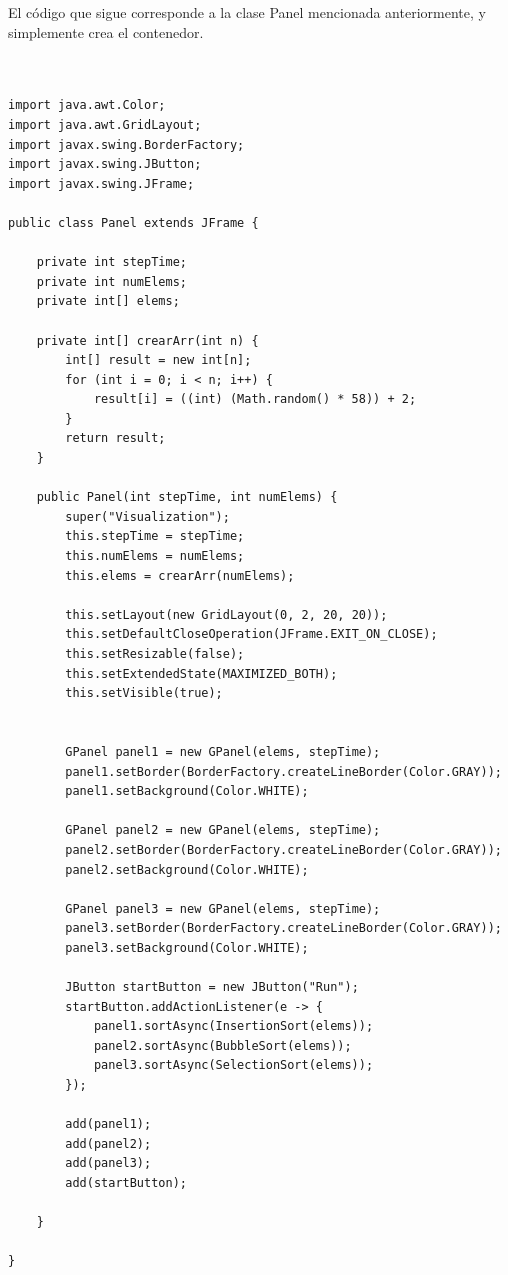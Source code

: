 \documentclass[paper=a4, fontsize=11pt]{scrartcl} %
\numberwithin{equation}{section} %
\numberwithin{figure}{section} %
\numberwithin{table}{section} %
\begin{document}
El código que sigue corresponde a la clase Panel mencionada anteriormente, y simplemente crea el contenedor.

\begin{lstlisting}


import java.awt.Color;
import java.awt.GridLayout;
import javax.swing.BorderFactory;
import javax.swing.JButton;
import javax.swing.JFrame;

public class Panel extends JFrame {

    private int stepTime;
    private int numElems;
    private int[] elems;

    private int[] crearArr(int n) {
        int[] result = new int[n];
        for (int i = 0; i < n; i++) {
            result[i] = ((int) (Math.random() * 58)) + 2;
        }
        return result;
    }

    public Panel(int stepTime, int numElems) {
        super("Visualization");
        this.stepTime = stepTime;
        this.numElems = numElems;
        this.elems = crearArr(numElems);

        this.setLayout(new GridLayout(0, 2, 20, 20));
        this.setDefaultCloseOperation(JFrame.EXIT_ON_CLOSE);
        this.setResizable(false);
        this.setExtendedState(MAXIMIZED_BOTH);
        this.setVisible(true);


        GPanel panel1 = new GPanel(elems, stepTime);
        panel1.setBorder(BorderFactory.createLineBorder(Color.GRAY));
        panel1.setBackground(Color.WHITE);

        GPanel panel2 = new GPanel(elems, stepTime);
        panel2.setBorder(BorderFactory.createLineBorder(Color.GRAY));
        panel2.setBackground(Color.WHITE);

        GPanel panel3 = new GPanel(elems, stepTime);
        panel3.setBorder(BorderFactory.createLineBorder(Color.GRAY));
        panel3.setBackground(Color.WHITE);

        JButton startButton = new JButton("Run");
        startButton.addActionListener(e -> {
            panel1.sortAsync(InsertionSort(elems));
            panel2.sortAsync(BubbleSort(elems));
            panel3.sortAsync(SelectionSort(elems));
        });

        add(panel1);
        add(panel2);
        add(panel3);
        add(startButton);

    }

}


\end{lstlisting}
\end{document}
